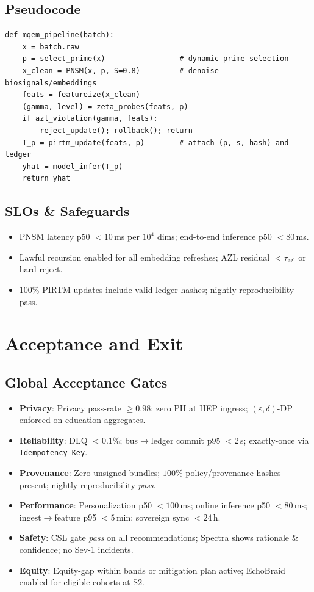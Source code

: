 \documentclass[11pt]{article}
\theoremstyle{plain}
\begin{document}
\subsection{Pseudocode}
\begin{verbatim}
def mqem_pipeline(batch):
    x = batch.raw
    p = select_prime(x)                 # dynamic prime selection
    x_clean = PNSM(x, p, S=0.8)         # denoise biosignals/embeddings
    feats = featureize(x_clean)
    (gamma, level) = zeta_probes(feats, p)
    if azl_violation(gamma, feats):
        reject_update(); rollback(); return
    T_p = pirtm_update(feats, p)        # attach (p, s, hash) and ledger
    yhat = model_infer(T_p)
    return yhat
\end{verbatim}

\subsection{SLOs \& Safeguards}
\begin{itemize}
  \item PNSM latency p50 $<10$\,ms per $10^4$ dims; end-to-end inference p50 $<80$\,ms.
  \item Lawful recursion enabled for all embedding refreshes; AZL residual $<\tau_{\text{azl}}$ or hard reject.
  \item $100\%$ PIRTM updates include valid ledger hashes; nightly reproducibility pass.
\end{itemize}

\section{Acceptance and Exit}

\subsection{Global Acceptance Gates}
\begin{itemize}
  \item \textbf{Privacy}: Privacy pass-rate $\ge 0.98$; zero PII at HEP ingress; $(\varepsilon,\delta)$-DP enforced on education aggregates.
  \item \textbf{Reliability}: DLQ $<0.1\%$; bus$\rightarrow$ledger commit p95 $<2$\,s; exactly-once via \texttt{Idempotency-Key}.
  \item \textbf{Provenance}: Zero unsigned bundles; $100\%$ policy/provenance hashes present; nightly reproducibility \emph{pass}.
  \item \textbf{Performance}: Personalization p50 $<100$\,ms; online inference p50 $<80$\,ms; ingest$\rightarrow$feature p95 $<5$\,min; sovereign sync $<24$\,h.
  \item \textbf{Safety}: CSL gate \emph{pass} on all recommendations; Spectra shows rationale \& confidence; no Sev-1 incidents.
  \item \textbf{Equity}: Equity-gap within bands or mitigation plan active; EchoBraid enabled for eligible cohorts at S2.
\end{itemize}
\end{document}
